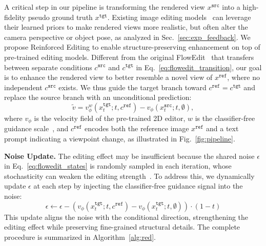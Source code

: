 \documentclass[runningheads]{llncs}
\begin{document}
A critical step in our pipeline is transforming the rendered view $x^{\texttt{src}}$ into a high-fidelity pseudo ground truth $x^{\texttt{tgt}}$.
Existing image editing models~\cite{wu2025qwen} can leverage their learned priors to make rendered views more realistic, but often alter the camera perspective or object pose, as analyzed in Sec.~\ref{sec:exp_feedback}.
We propose Reinforced Editing to enable structure-preserving enhancement on top of pre-trained editing models.
Different from the original FlowEdit~\cite{couairon2024flowedit} that transfers between separate conditions $c^{\texttt{src}}$ and $c^{\texttt{tgt}}$ in Eq.~\ref{eq:flowedit_transition}, our goal is to enhance the rendered view to better resemble a novel view of $x^{\texttt{ref}}$, where no independent $c^{\texttt{src}}$ exists.
We thus guide the target branch toward $c^{\texttt{ref}} = c^{\texttt{tgt}}$ and replace the source branch with an unconditional prediction:
\begin{equation}
    \label{eq:red_diff_velocity}
    \tilde{v} = v_\phi^{w}(x_t^{\texttt{tgt}}; t, c^{\texttt{ref}}) - v_\phi(x_t^{\texttt{src}}; t, \emptyset),
\end{equation}
where $v_\phi$ is the velocity field of the pre-trained 2D editor, $w$ is the classifier-free guidance scale~\cite{ho2021classifier}, and $c^{\texttt{ref}}$ encodes both the reference image $x^{\texttt{ref}}$ and a text prompt indicating a viewpoint change, as illustrated in Fig.~\ref{fig:pipeline}.

\textbf{Noise Update.}
The editing effect may be insufficient because the shared noise $\epsilon$ in Eq.~\ref{eq:flowedit_states} is randomly sampled in each iteration, whose stochasticity can weaken the editing strength~\cite{xie2026dnaedit}.
To address this, we dynamically update $\epsilon$ at each step by injecting the classifier-free guidance signal into the noise:
\begin{equation}
    \label{eq:red_dynamic_noise}
    \epsilon \leftarrow \epsilon - (v_\phi(x_t^{\texttt{tgt}}; t, c^{\texttt{ref}}) - v_\phi(x_t^{\texttt{tgt}}; t, \emptyset)) \cdot (1-t)
\end{equation}
This update aligns the noise with the conditional direction, strengthening the editing effect while preserving fine-grained structural details.
The complete procedure is summarized in Algorithm~\ref{alg:red}.
\end{document}

